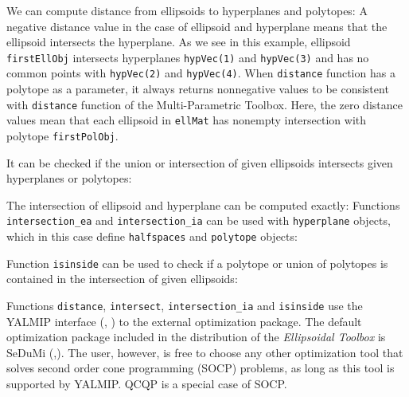 We can compute distance from ellipsoids to hyperplanes and polytopes:
A negative distance value in the case of ellipsoid and hyperplane means that
the ellipsoid intersects the hyperplane. As we see in this example, ellipsoid
{\tt firstEllObj} intersects  hyperplanes {\tt hypVec(1)} and {\tt hypVec(3)} and has
no common points with {\tt hypVec(2)} and {\tt hypVec(4)}. When {\tt distance} function
has a polytope as a parameter, it always returns nonnegative values to be
consistent with {\tt distance} function of the Multi-Parametric Toolbox.
Here, the zero distance values mean that each ellipsoid in {\tt ellMat} has
nonempty intersection with polytope {\tt firstPolObj}.

It can be checked if the union or intersection of given ellipsoids intersects
given hyperplanes or polytopes:



The intersection of ellipsoid and hyperplane can be computed exactly:
Functions {\tt intersection\_ea} and {\tt intersection\_ia} can be used
with {\tt hyperplane} objects, which in this case define {\tt halfspaces} and
{\tt polytope} objects:

Function {\tt isinside} can be used to check if a polytope or union of
polytopes is contained in the intersection of given ellipsoids:

Functions {\tt distance}, {\tt intersect}, {\tt intersection\_ia} and
{\tt isinside} use the YALMIP interface (\cite{yalmip}, \cite{yalmiphp}) to the
external optimization package. The default optimization package included
in the distribution of the {\it Ellipsoidal Toolbox} is SeDuMi
(\cite{sedumi},\cite{sedumihp}). The user, however, is free to choose
any other optimization tool that solves second order cone programming (SOCP)
problems, as long as this tool is supported by YALMIP. QCQP is a special case
of SOCP.



